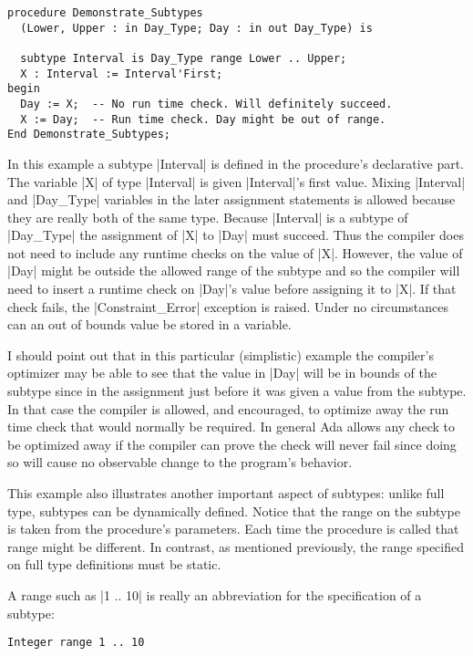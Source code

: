 \begin{lstlisting}
procedure Demonstrate_Subtypes
  (Lower, Upper : in Day_Type; Day : in out Day_Type) is

  subtype Interval is Day_Type range Lower .. Upper;
  X : Interval := Interval'First;
begin
  Day := X;  -- No run time check. Will definitely succeed.
  X := Day;  -- Run time check. Day might be out of range.
End Demonstrate_Subtypes;
\end{lstlisting}

In this example a subtype |Interval| is defined in the procedure's declarative part. The
variable |X| of type |Interval| is given |Interval|'s first value. Mixing |Interval| and
|Day_Type| variables in the later assignment statements is allowed because they are really both
of the same type. Because |Interval| is a subtype of |Day_Type| the assignment of |X| to |Day|
must succeed. Thus the compiler does not need to include any runtime checks on the value of |X|.
However, the value of |Day| might be outside the allowed range of the subtype and so the
compiler will need to insert a runtime check on |Day|'s value before assigning it to |X|. If
that check fails, the |Constraint_Error| exception is raised. Under no circumstances can an out
of bounds value be stored in a variable.

I should point out that in this particular (simplistic) example the compiler's optimizer may be
able to see that the value in |Day| will be in bounds of the subtype since in the assignment
just before it was given a value from the subtype. In that case the compiler is allowed, and
encouraged, to optimize away the run time check that would normally be required. In general Ada
allows any check to be optimized away if the compiler can prove the check will never fail since
doing so will cause no observable change to the program's behavior.

This example also illustrates another important aspect of subtypes: unlike full type, subtypes
can be dynamically defined. Notice that the range on the subtype is taken from the procedure's
parameters. Each time the procedure is called that range might be different. In contrast, as
mentioned previously, the range specified on full type definitions must be static.

A range such as |1 .. 10| is really an abbreviation for the specification of a subtype:

\begin{lstlisting}
Integer range 1 .. 10
\end{lstlisting}

